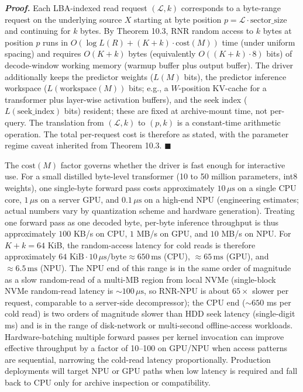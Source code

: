 \documentclass[
]{article}
\begin{document}
\emph{\textbf{Proof.}} Each LBA-indexed read request $(\mathcal{L},
k)$ corresponds to a byte-range request on the underlying source $X$
starting at byte position
$p = \mathcal{L} \cdot \text{sector\_size}$ and continuing for $k$
bytes. By Theorem 10.3, RNR random access to $k$ bytes at position
$p$ runs in $O(\log L(R) + (K + k) \cdot \mathrm{cost}(M))$ time
(under uniform spacing) and
requires $O(K + k)$ bytes (equivalently $O((K+k) \cdot 8)$ bits) of
decode-window working memory (warmup buffer plus output buffer).
The driver additionally keeps the predictor weights ($L(M)$ bits),
the predictor inference workspace ($L(\mathrm{workspace}(M))$ bits;
e.g., a $W$-position KV-cache for a transformer plus layer-wise
activation buffers), and the seek index ($L(\mathrm{seek\_index})$
bits) resident; these are fixed at archive-mount time, not
per-query. The translation from $(\mathcal{L}, k)$ to
$(p, k)$ is a constant-time arithmetic operation. The total
per-request cost is therefore as stated, with the parameter regime
caveat inherited from Theorem 10.3. \hfill$\blacksquare$

The $\mathrm{cost}(M)$ factor governs whether the driver is fast
enough for interactive use. For a small distilled byte-level
transformer (10 to 50 million parameters, int8 weights), one
single-byte forward pass costs approximately $10\,\mu\text{s}$ on a
single CPU core, $1\,\mu\text{s}$ on a server GPU, and
$0.1\,\mu\text{s}$ on a high-end NPU (engineering estimates; actual
numbers vary by quantization scheme and hardware generation).
Treating one forward pass as one decoded byte, per-byte inference
throughput is thus approximately $100$ KB/s on CPU, $1$ MB/s on
GPU, and $10$ MB/s on NPU. For $K + k = 64$ KiB, the random-access
latency for cold reads is therefore approximately
$64 \text{ KiB} \cdot 10\,\mu\text{s/byte} \approx 650\,\text{ms}$
(CPU), $\approx 65\,\text{ms}$ (GPU), and
$\approx 6.5\,\text{ms}$ (NPU). The NPU end of this range is in the
same order of magnitude as a slow random-read of a multi-MB region
from local NVMe (single-block NVMe random-read latency is
$\sim 100\,\mu\text{s}$, so RNR-NPU is about $65 \times$ slower per
request, comparable to a server-side decompressor); the CPU end
($\sim 650$ ms per cold read) is two orders of magnitude slower
than HDD seek latency (single-digit ms) and is in the range of
disk-network or multi-second offline-access workloads. Hardware-batching multiple
forward passes per kernel invocation can improve effective
throughput by a factor of 10--100 on GPU/NPU when access patterns
are sequential, narrowing the cold-read latency proportionally.
Production deployments will target NPU or GPU paths when low latency
is required and fall back to CPU only for archive inspection or
compatibility.
\end{document}
